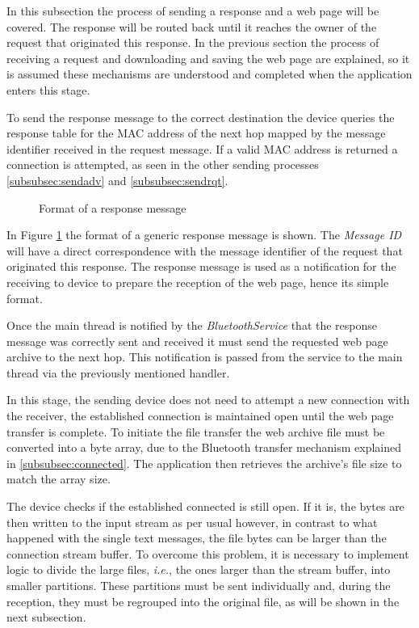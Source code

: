 In this subsection the process of sending a response and a web page will be covered. The response will be routed back until it reaches the owner of the request that originated this response. In the previous section the process of receiving a request and downloading and saving the web page are explained, so it is assumed these mechanisms are understood and completed when the application enters this stage.

To send the response message to the correct destination the device queries the response table for the \gls{MAC} address of the next hop mapped by the message identifier received in the request message. If a valid \gls{MAC} address is returned a connection is attempted, as seen in the other sending processes \ref{subsubsec:sendadv} and \ref{subsubsec:sendrqt}.

\begin{figure}[ht]
   \noindent{}
	\caption{\label{fig:rspmsg} Format of a response message}
\end{figure}

In Figure \ref{fig:rspmsg} the format of a generic response message is shown. The \textit{Message ID} will have a direct correspondence with the message identifier of the request that originated this response. The response message is used as a notification for the receiving to device to prepare the reception of the web page, hence its simple format.

Once the main thread is notified by the \textit{BluetoothService} that the response message was correctly sent and received it must send the requested web page archive to the next hop. This notification is passed from the service to the main thread via the previously mentioned handler.

In this stage, the sending device does not need to attempt a new connection with the receiver, the established connection is maintained open until the web page transfer is complete. To initiate the file transfer the web archive file must be converted into a byte array, due to the Bluetooth transfer mechanism explained in \ref{subsubsec:connected}. The application then retrieves the archive's file size to match the array size.

The device checks if the established connected is still open. If it is, the bytes are then written to the input stream as per usual however, in contrast to what happened with the single text messages, the file bytes can be larger than the connection stream buffer. To overcome this problem, it is necessary to implement logic to divide the large files, \textit{i.e.}, the ones larger than the stream buffer, into smaller partitions. These partitions must be sent individually and, during the reception, they must be regrouped into the original file, as will be shown in the next subsection.

